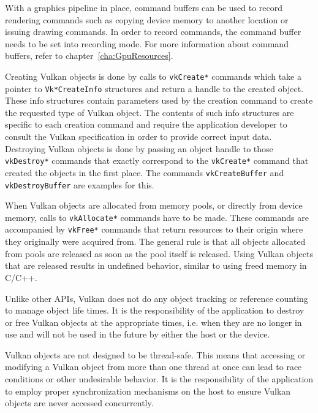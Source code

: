     With a graphics pipeline in place, command buffers can be used to record rendering commands such as copying \gls{device} memory to another location or issuing drawing commands. In order to record commands, the command buffer needs to be set into recording mode. For more information about command buffers, refer to chapter~\ref{cha:GpuResources}.

    Creating Vulkan objects is done by calls to \lstinline{vkCreate*} commands which take a pointer to \lstinline{Vk*CreateInfo}{} structures and return a handle to the created object. These info structures contain parameters used by the creation command to create the requested type of Vulkan object. The contents of such info structures are specific to each creation command and require the \gls{application} developer to consult the Vulkan specification in order to provide correct input data. Destroying Vulkan objects is done by passing an object handle to those \lstinline{vkDestroy*} commands that exactly correspond to the \lstinline{vkCreate*} command that created the objects in the first place. The commands \lstinline{vkCreateBuffer} and \lstinline{vkDestroyBuffer} are examples for this.

    When Vulkan objects are allocated from memory pools, or directly from \gls{device} memory, calls to \lstinline{vkAllocate*} commands have to be made. These commands are accompanied by \lstinline{vkFree*} commands that return resources to their origin where they originally were acquired from. The general rule is that all objects allocated from pools are released as soon as the pool itself is released. Using Vulkan objects that are released results in undefined behavior, similar to using freed memory in C/C++.

    Unlike other APIs, Vulkan does not do any object tracking or reference counting to manage object life times. It is the responsibility of the \gls{application} to destroy or free Vulkan objects at the appropriate times, i.e. when they are no longer in use and will not be used in the future by either the \gls{host} or the device.

    Vulkan objects are not designed to be thread-safe. This means that accessing or modifying a Vulkan object from more than one thread at once can lead to race conditions or other undesirable behavior. It is the responsibility of the \gls{application} to employ proper synchronization mechanisms on the \gls{host} to ensure Vulkan objects are never accessed concurrently.


